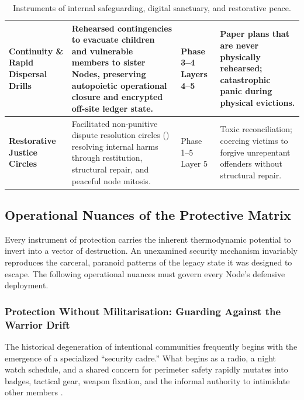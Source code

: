 \begin{table}[htbp]
\begin{tabular}{|p{}|p{}|p{}|p{}|}
\hline
\textbf{Continuity \& Rapid Dispersal Drills} & Rehearsed contingencies to evacuate children and vulnerable members to sister Nodes, preserving autopoietic operational closure and encrypted off-site ledger state. & Phase 3--4 \newline Layers 4--5 & Paper plans that are never physically rehearsed; catastrophic panic during physical evictions. \\
\hline
\textbf{Restorative Justice Circles} & Facilitated non-punitive dispute resolution circles (\parencite{zehr1990}) resolving internal harms through restitution, structural repair, and peaceful node mitosis. & Phase 1--5 \newline Layer 5 & Toxic reconciliation; coercing victims to forgive unrepentant offenders without structural repair. \\
\hline
\end{tabular}
\caption{Instruments of internal safeguarding, digital sanctuary, and restorative peace.}
\label{tab:genesis-instruments-int}
\end{table}

\subsection{Operational Nuances of the Protective Matrix}
\label{sec:genesis-nuances}

Every instrument of protection carries the inherent thermodynamic potential to invert into a vector of destruction. An unexamined security mechanism invariably reproduces the carceral, paranoid patterns of the legacy state it was designed to escape. The following operational nuances must govern every Node's defensive deployment.

\subsubsection{Protection Without Militarisation: Guarding Against the Warrior Drift}

The historical degeneration of intentional communities frequently begins with the emergence of a specialized ``security cadre.'' What begins as a radio, a night watch schedule, and a shared concern for perimeter safety rapidly mutates into badges, tactical gear, weapon fixation, and the informal authority to intimidate other members \parencite{freeman1972}.

